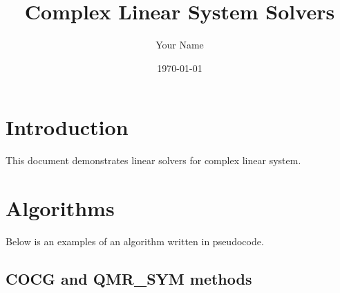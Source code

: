 \documentclass{article}
\begin{document}
\title{Complex Linear System Solvers}
\author{Your Name}
\date{\today}
\maketitle

\section{Introduction}
This document demonstrates linear solvers for complex linear system.

\section{Algorithms}
Below is an examples of an algorithm written in pseudocode.

\subsection{COCG and QMR\_SYM methods}
\end{document}
